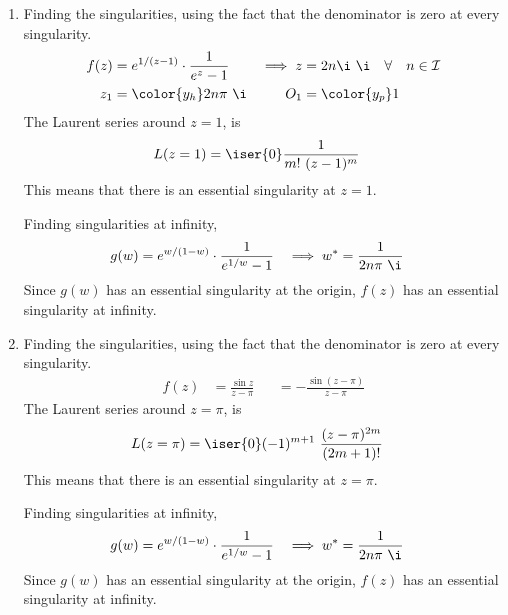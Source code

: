 \begin{enumerate}
    \item Finding the singularities, using the fact that the denominator is zero at
          every singularity.
          \begin{align}
              f(z)       & = e^{1/(z-1)} \cdot \frac{1}{e^z - 1} &
              \implies z & = 2n\i\ \i
              \quad \forall \quad n \in \mathcal{I}                \\
              z_1        & = \color{y_h} 2n\pi\ \i               &
              O_1        & = \color{y_p} 1
          \end{align}
          The Laurent series around $ z = 1 $, is
          \begin{align}
              L(z = 1) & = \iser{0}  \frac{1}{m!\ (z-1)^m}
          \end{align}
          This means that there is an essential singularity at $ z = 1 $. \par
          Finding singularities at infinity,
          \begin{align}
              g(w)         & = e^{w/(1-w)} \cdot \frac{1}{e^{1/w} - 1} &
              \implies w^* & = \frac{1}{2n\pi\ \i}
          \end{align}
          Since $ g(w) $ has an essential singularity at the origin,
          $ f(z) $ has an essential singularity at infinity.

    \item Finding the singularities, using the fact that the denominator is zero at
          every singularity.
          \begin{align}
              f(z) & = \frac{\sin z}{z - \pi}         &
                   & = -\frac{\sin(z - \pi)}{z - \pi}
          \end{align}
          The Laurent series around $ z = \pi $, is
          \begin{align}
              L(z = \pi) & = \iser{0} (-1)^{m+1}\ \frac{(z-\pi)^{2m}}{(2m+1)!}
          \end{align}
          This means that there is an essential singularity at $ z = \pi $. \par
          Finding singularities at infinity,
          \begin{align}
              g(w)         & = e^{w/(1-w)} \cdot \frac{1}{e^{1/w} - 1} &
              \implies w^* & = \frac{1}{2n\pi\ \i}
          \end{align}
          Since $ g(w) $ has an essential singularity at the origin,
          $ f(z) $ has an essential singularity at infinity.


\end{enumerate}
